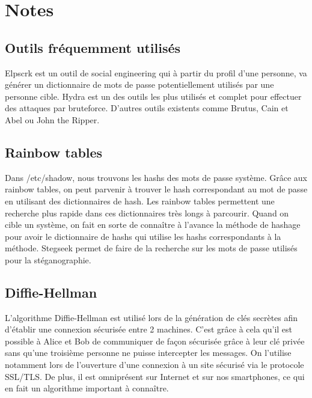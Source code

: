 \documentclass[12pt, oneside]{article}
\begin{document}
\section{Notes}
\subsection{Outils fréquemment utilisés}
Elpscrk est un outil de social engineering qui à partir du profil d'une personne, va générer un dictionnaire de mots de passe potentiellement utilisés par une personne cible. 
Hydra est un des outils les plus utilisés et complet pour effectuer des attaques par bruteforce. 
D'autres outils existents comme Brutus, Cain et Abel ou John the Ripper.

\subsection{Rainbow tables}
Dans /etc/shadow, nous trouvons les hashs des mots de passe système. Grâce aux rainbow tables, on peut parvenir à trouver le hash correspondant au mot de passe en utilisant des dictionnaires de hash. 
Les rainbow tables permettent une recherche plus rapide dans ces dictionnaires très longs à parcourir. 
Quand on cible un système, on fait en sorte de connaître à l'avance la méthode de hashage pour avoir le dictionnaire de hashs qui utilise les hashs correspondants à la méthode. 
Stegseek permet de faire de la recherche sur les mots de passe utilisés pour la stéganographie. 

\subsection{Diffie-Hellman}
L'algorithme Diffie-Hellman est utilisé lors de la génération de clés secrètes afin d'établir une connexion sécurisée entre 2 machines. C'est grâce à cela qu'il est possible à Alice et Bob de communiquer de façon sécurisée grâce à leur clé privée sans qu'une troisième personne ne puisse intercepter les messages. On l'utilise notamment lors de l’ouverture d’une connexion à un site sécurisé via le protocole SSL/TLS. De plus, il est omniprésent sur Internet et sur nos smartphones, ce qui en fait un algorithme important à connaître. 
\end{document}
